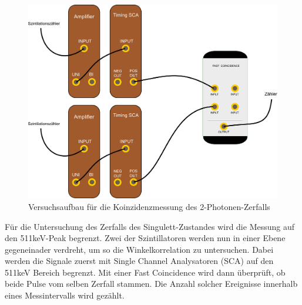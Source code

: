 \begin{figure}[H]
 \includegraphics[width=\textwidth]{BilderAufbau/2er-koinzidenz.pdf}
 \caption{Versuchsaufbau für die Koinzidenzmessung des 2-Photonen-Zerfalls}
 \label{schaltplan_2_sca_coin_zaehler}
\end{figure}

Für die Untersuchung des Zerfalls des Singulett-Zustandes wird die Messung auf den 511keV-Peak begrenzt. Zwei der Szintillatoren werden nun in einer Ebene gegeneinader verdreht, um so die Winkelkorrelation zu untersuchen. Dabei werden die Signale zuerst mit Single Channel Analysatoren (SCA) auf den 511keV Bereich begrenzt. Mit einer Fast Coincidence wird dann überprüft, ob beide Pulse vom selben Zerfall stammen. Die Anzahl solcher Ereignisse innerhalb eines Messintervalls wird gezählt. 


